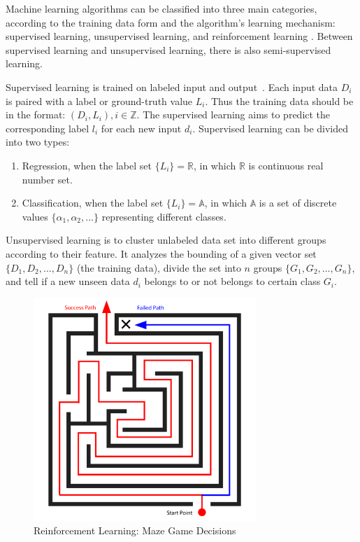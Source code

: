 \begin{spacing}{1.5}
Machine learning algorithms can be classified into three main categories, according to the training data form and the algorithm's learning mechanism: supervised learning, unsupervised learning, and reinforcement learning \cite{mohri2018foundations}. Between supervised learning and unsupervised learning, there is also semi-supervised learning.

Supervised learning is trained on labeled input and output~\cite{sen2020supervised, kotsiantis2007supervised}. Each input data $D_i$ is paired with a label or ground-truth value $L_i$. Thus the training data should be in the format: $(D_i, L_i), i \in \mathbb{Z}$. The supervised learning aims to predict the corresponding label $l_i$ for each new input $d_i$. Supervised learning can be divided into two types: 

\begin{enumerate}
    \item Regression, when the label set $\{L_i\} = \mathbb{R}$, in which $\mathbb{R}$ is continuous real number set.
    \item Classification, when the label set $\{L_i\} = \mathbb{A}$, in which $\mathbb{A}$ is a set of discrete values $\{\alpha_1, \alpha_2, ...\}$ representing different classes.
\end{enumerate}

Unsupervised learning is to cluster unlabeled data set into different groups according to their feature\cite{meena2019survey}. It analyzes the bounding of a given vector set $\{D_1, D_2, ...,D_n\}$ (the training data), divide the set into $n$ groups $\{G_1, G_2, ..., G_n\}$, and tell if a new unseen data $d_i$ belongs to or not belongs to certain class $G_i$.

\begin{figure}[ht]
\centering
\includegraphics[width=0.75\textwidth, fbox]{Chapter2/reinforcement.pdf}
\caption{Reinforcement Learning: Maze Game Decisions}
\label{fig:reinforcement} 
\end{figure}


\end{spacing}
